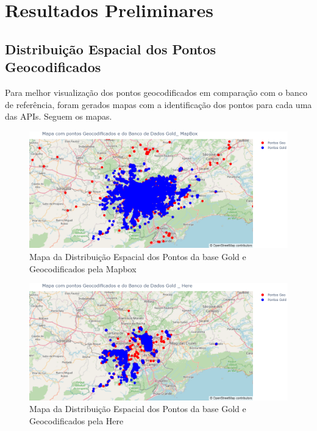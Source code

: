 \documentclass{article}
\begin{document}
\section{Resultados Preliminares}

\subsection{Distribuição Espacial dos Pontos Geocodificados}
Para melhor visualização dos pontos geocodificados em comparação com o banco de referência, foram gerados mapas com a identificação dos pontos para cada uma das APIs. Seguem os mapas. 

\begin{figure}[ht]
  \centering
  \includegraphics[width=\textwidth]{mapapontos1.png}
  \caption{Mapa da Distribuição Espacial dos Pontos da base Gold e Geocodificados pela Mapbox}
  \label{fig:mapapontos1}
\end{figure}

\begin{figure}[ht]
  \centering
  \includegraphics[width=\textwidth]{mapapontos2.png}
  \caption{Mapa da Distribuição Espacial dos Pontos da base Gold e Geocodificados pela Here}
  \label{fig:mapapontos2}
\end{figure}
\end{document}
